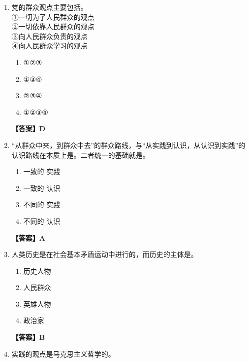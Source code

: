 \documentclass[UTF8,11pt,a4paper]{ctexart}
\begin{document}
\begin{enumerate}[label=\textbf{\arabic*.}, leftmargin=2.5em, itemsep=0.7em]
\begin{enumerate}[label=\Alph*., leftmargin=2em, itemsep=0.1em, topsep=0.15em]
\item 乡镇乡镇
\item 农村农村
\item 城市城市
\item 沿海城市沿海城市
\end{enumerate}
\textbf{【答案】B}
\item 党的群众观点主要包括\allowbreak\underline{\hspace{4em}}。\\ ①一切为了人民群众的观点\\ ②一切依靠人民群众的观点\\ ③向人民群众负责的观点\\ ④向人民群众学习的观点
\begin{enumerate}[label=\Alph*., leftmargin=2em, itemsep=0.1em, topsep=0.15em]
\item ①②③
\item ①③④
\item ②③④
\item ①②③④
\end{enumerate}
\textbf{【答案】D}
\item “从群众中来，到群众中去”的群众路线，与“从实践到认识，从认识到实践”的认识路线在本质上是\allowbreak\underline{\hspace{4em}}。二者统一的基础就是\allowbreak\underline{\hspace{4em}}。
\begin{enumerate}[label=\Alph*., leftmargin=2em, itemsep=0.1em, topsep=0.15em]
\item 一致的 实践
\item 一致的 认识
\item 不同的 实践
\item 不同的 认识
\end{enumerate}
\textbf{【答案】A}
\item 人类历史是在社会基本矛盾运动中进行的，而历史的主体是\allowbreak\underline{\hspace{4em}}。
\begin{enumerate}[label=\Alph*., leftmargin=2em, itemsep=0.1em, topsep=0.15em]
\item 历史人物
\item 人民群众
\item 英雄人物
\item 政治家
\end{enumerate}
\textbf{【答案】B}
\item 实践的观点是马克思主义哲学的\allowbreak\underline{\hspace{4em}}。
\begin{enumerate}[label=\Alph*., leftmargin=2em, itemsep=0.1em, topsep=0.15em]

\end{enumerate}
\end{enumerate}
\end{document}
